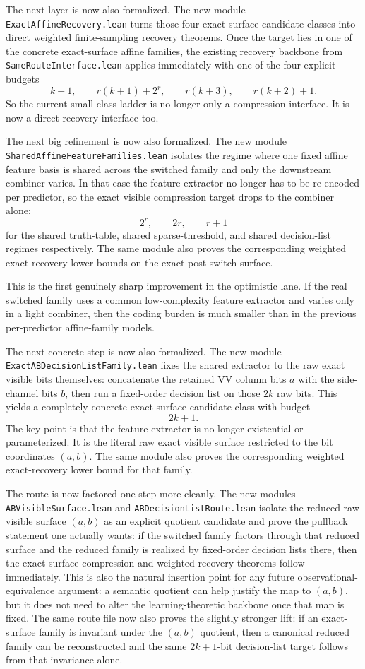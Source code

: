 \documentclass[11pt]{article}
\theoremstyle{remark}
\begin{document}
The next layer is now also formalized.  The new module
\texttt{ExactAffineRecovery.lean} turns those four exact-surface candidate
classes into direct weighted finite-sampling recovery theorems.  Once the
target lies in one of the concrete exact-surface affine families, the existing
recovery backbone from \texttt{SameRouteInterface.lean} applies immediately
with one of the four explicit budgets
\[
  k+1, \qquad r(k+1)+2^r, \qquad r(k+3), \qquad r(k+2)+1.
\]
So the current small-class ladder is no longer only a compression interface.
It is now a direct recovery interface too.

The next big refinement is now also formalized.  The new module
\texttt{SharedAffineFeatureFamilies.lean} isolates the regime where one fixed
affine feature basis is shared across the switched family and only the
downstream combiner varies.  In that case the feature extractor no longer has
to be re-encoded per predictor, so the exact visible compression target drops
to the combiner alone:
\[
  2^r, \qquad 2r, \qquad r+1
\]
for the shared truth-table, shared sparse-threshold, and shared decision-list
regimes respectively.  The same module also proves the corresponding weighted
exact-recovery lower bounds on the exact post-switch surface.

This is the first genuinely sharp improvement in the optimistic lane.  If the
real switched family uses a common low-complexity feature extractor and varies
only in a light combiner, then the coding burden is much smaller than in the
previous per-predictor affine-family models.

The next concrete step is now also formalized.  The new module
\texttt{ExactABDecisionListFamily.lean} fixes the shared extractor to the raw
exact visible bits themselves: concatenate the retained VV column bits \(a\)
with the side-channel bits \(b\), then run a fixed-order decision list on those
\(2k\) raw bits.  This yields a completely concrete exact-surface candidate
class with budget
\[
  2k + 1.
\]
The key point is that the feature extractor is no longer existential or
parameterized.  It is the literal raw exact visible surface restricted to the
bit coordinates \((a,b)\).  The same module also proves the corresponding
weighted exact-recovery lower bound for that family.

The route is now factored one step more cleanly.  The new modules
\texttt{ABVisibleSurface.lean} and \texttt{ABDecisionListRoute.lean} isolate the
reduced raw visible surface \((a,b)\) as an explicit quotient candidate and
prove the pullback statement one actually wants: if the switched family factors
through that reduced surface and the reduced family is realized by fixed-order
decision lists there, then the exact-surface compression and weighted recovery
theorems follow immediately.  This is also the natural insertion point for any
future observational-equivalence argument: a semantic quotient can help justify
the map to \((a,b)\), but it does not need to alter the learning-theoretic
backbone once that map is fixed.  The same route file now also proves the
slightly stronger lift: if an exact-surface family is invariant under the
\((a,b)\) quotient, then a canonical reduced family can be reconstructed and
the same \(2k+1\)-bit decision-list target follows from that invariance alone.
\end{document}
